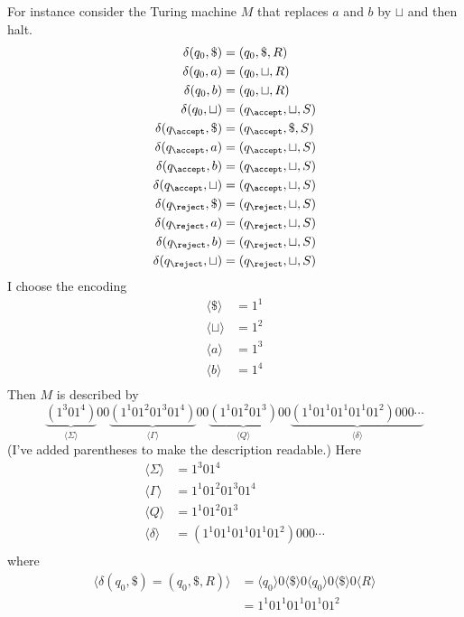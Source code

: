 For instance consider the Turing machine $M$
that replaces $a$ and $b$ by $\sqcup$ and then halt.
\begin{align*}
  \delta(q_0, \$) &= (q_0, \$, R) \\
  \delta(q_0, a)  &= (q_0, \sqcup, R) \\
  \delta(q_0, b)  &= (q_0, \sqcup, R) \\
  \delta(q_0, \sqcup)  &= (q_\accept, \sqcup, S) \\
  \delta(q_\accept, \$) &= (q_\accept, \$, S) \\
  \delta(q_\accept, a)  &= (q_\accept, \sqcup, S) \\
  \delta(q_\accept, b)  &= (q_\accept, \sqcup, S) \\
  \delta(q_\accept, \sqcup)  &= (q_\accept, \sqcup, S) \\
  \delta(q_\reject, \$) &= (q_\reject, \sqcup, S) \\
  \delta(q_\reject, a) &= (q_\reject, \sqcup, S) \\
  \delta(q_\reject, b) &= (q_\reject, \sqcup, S) \\
  \delta(q_\reject, \sqcup) &= (q_\reject, \sqcup, S) \\
\end{align*}
I choose the encoding
\begin{align*}
  \langle \$ \rangle  &= 1^1 \\
  \langle \sqcup \rangle  &= 1^2 \\
  \langle a \rangle  &= 1^3 \\
  \langle b \rangle  &= 1^4 \\
\end{align*}
Then $M$ is described by
\[
\underbrace{(1^3 0 1^4)}_{\textstyle\langle \Sigma \rangle} 00
\underbrace{(1^1 0 1^2 0 1^3 0 1^4)}_{\textstyle\langle \Gamma \rangle} 00
\underbrace{(1^1 0 1^2 0 1^3)}_{\textstyle \langle Q \rangle} 00
\underbrace{(1^1 0 1^1 0 1^1 0 1^1 0 1^2) 000 \cdots}_{\textstyle \langle \delta \rangle}
\]
(I've added parentheses to make the description readable.)
Here
\begin{align*}  
\langle \Sigma \rangle &= 1^3 0 1^4 \\
\langle \Gamma \rangle &= 1^1 0 1^2 0 1^3 0 1^4 \\
\langle Q \rangle &= 1^1 0 1^2 0 1^3 \\
\langle \delta \rangle &= (1^1 0 1^1 0 1^1 0 1^1 0 1^2) 000 \cdots \\
\end{align*}
where
\begin{align*}
\biggl\langle \delta(q_0, \$) = (q_0, \$, R) \biggr\rangle 
&=
\langle q_0 \rangle 0
\langle \$ \rangle 0
\langle q_0 \rangle 0
\langle \$ \rangle 0
\langle R \rangle \\
&= 1^1 0 1^1 0 1^1 0 1^1 0 1^2
\end{align*}


